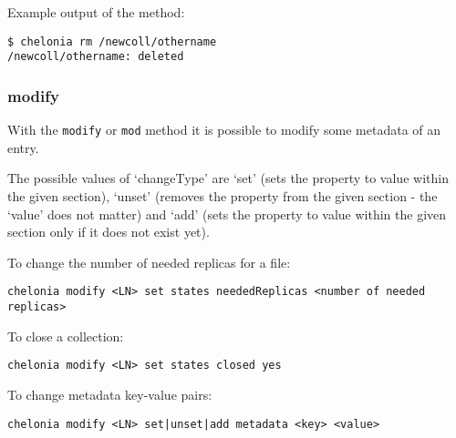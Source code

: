 Example output of the method:
\begin{verbatim}
$ chelonia rm /newcoll/othername
/newcoll/othername: deleted    
\end{verbatim}

\subsubsection{modify} %
\label{ssub:modify}

With the \texttt{modify} or \texttt{mod} method it is possible to modify some metadata of an entry.
\hspace*{0.5cm}
\begin{shaded}
\end{shaded}

The possible values of `changeType' are `set' (sets the property to value within the given section), `unset' (removes the property from the given section - the `value' does not matter) and `add' (sets the property to value within the given section only if it does not exist yet). 

To change the number of needed replicas for a file:
\begin{verbatim}
chelonia modify <LN> set states neededReplicas <number of needed replicas>    
\end{verbatim}

To close a collection:
\begin{verbatim}
chelonia modify <LN> set states closed yes    
\end{verbatim}

To change metadata key-value pairs:
\begin{verbatim}
chelonia modify <LN> set|unset|add metadata <key> <value>    
\end{verbatim}
